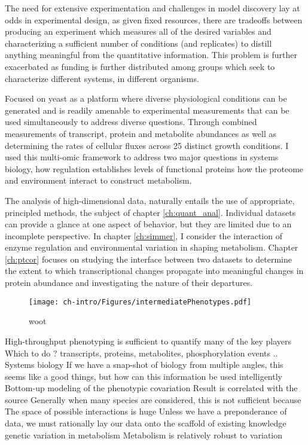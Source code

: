 The need for extensive experimentation and challenges in model discovery lay at odds in experimental design, as given fixed resources, there are tradeoffs between producing an experiment which measures all of the desired variables and characterizing a sufficient number of conditions (and replicates) to distill anything meaningful from the quantitative information. This problem is further exacerbated as funding is further distributed among groups which seek to characterize different systems, in different organisms. 

Focused on yeast as a platform where diverse physiological conditions can be generated and is readily amenable to experimental measurements that can be used simultaneously to address diverse questions. Through combined measurements of transcript, protein and metabolite abundances as well as determining the rates of cellular fluxes across 25 distinct growth conditions. I used this multi-omic framework to address two major questions in systems biology, how regulation establishes levels of functional proteins how the proteome and environment interact to construct metabolism.

The analysis of high-dimensional data, naturally entails the use of appropriate, principled methods, the subject of chapter \ref{ch:quant_anal}. Individual datasets can provide a glance at one aspect of behavior, but they are limited due to an incomplete perspective.  In chapter \ref{ch:simmer}, I consider the interaction of enzyme regulation and environmental variation in shaping metabolism. Chapter \ref{ch:ptcor} focuses on studying the interface between two datasets to determine the extent to which transcriptional changes propagate into meaningful changes in protein abundance and investigating the nature of their departures.  


\begin{figure}[h!]
\begin{center}
\texttt{[image: ch-intro/Figures/intermediatePhenotypes.pdf]}
\end{center}
\caption{woot}
\label{fig:intpheno}
\end{figure}

\begin{outline}
\1 High-throughput phenotyping is sufficient to quantify many of the key players
\2 Which to do ? transcripts, proteins, metabolites, phosphorylation events ..
\1 Systems biology
\2 If we have a snap-shot of biology from multiple angles, this seems like a good things, but how can this information be used intelligently
\2 Bottom-up modeling of the phenotypic covariation
\3 Result is correlated with the source
\3 Generally when many species are considered, this is not sufficient because  
\2 The space of possible interactions is huge
\3 Unless we have a preponderance of data, we must rationally lay our data onto the scaffold of existing knowledge
\1 genetic variation in metabolism
\1 Metabolism is relatively robust to variation
\end{outline}


